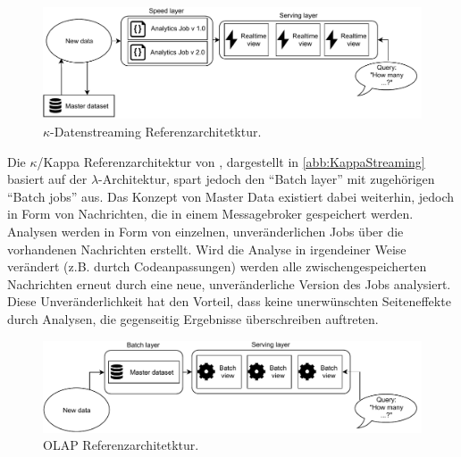 \begin{figure}[H]
\centering
\includegraphics[width=\textwidth]{graphics/Kappa-Reference-Architecture.pdf}
\caption[$\kappa$-Datenstreaming Referenzarchitetktur]{$\kappa$-Datenstreaming Referenzarchitetktur.\footnotemark}
\label{abb:KappaStreaming}
\end{figure}

Die $\kappa$/Kappa Referenzarchitektur von \citeauthor{Kreps.2014}, dargestellt in \autoref{abb:KappaStreaming} basiert auf der $\lambda$-Architektur, spart jedoch den \enquote{Batch layer} mit zugehörigen \enquote{Batch jobs} aus. Das Konzept von Master Data existiert dabei weiterhin, jedoch in Form von Nachrichten, die in einem Messagebroker gespeichert werden. Analysen werden in Form von einzelnen, unveränderlichen Jobs über die vorhandenen Nachrichten erstellt. Wird die Analyse in irgendeiner Weise verändert (z.B. durtch Codeanpassungen) werden alle zwischengespeicherten Nachrichten erneut durch eine neue, unveränderliche Version des Jobs analysiert. Diese Unveränderlichkeit hat den Vorteil, dass keine unerwünschten Seiteneffekte durch Analysen, die gegenseitig Ergebnisse überschreiben auftreten. 




\begin{figure}[H]
\centering
\includegraphics[width=\textwidth]{graphics/OLAP-Reference-Architecture.pdf}
\caption[OLAP Referenzarchitetktur]{OLAP Referenzarchitetktur.\footnotemark}
\label{abb:OLAPStreaming}
\end{figure}

